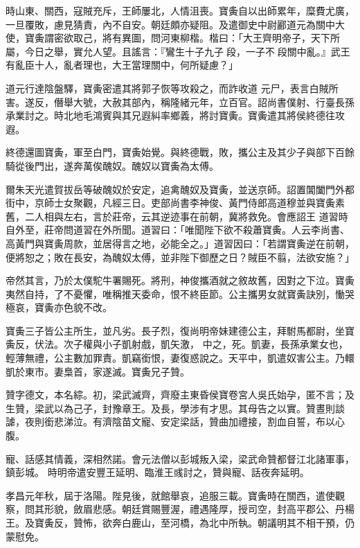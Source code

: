 \begin{pinyinscope}
 時山東、關西，寇賊充斥，王師屢北，人情沮喪。寶夤自以出師累年，糜費尤廣，一旦覆敗，慮見猜責，內不自安。朝廷頗亦疑阻。及遣御史中尉酈道元為關中大使，寶夤謂密欲取己，將有異圖，問河東柳楷。楷曰：「大王齊明帝子，天下所屬，今日之舉，實允人望。且謠言：『鸞生十子九子段，一子不段關中亂。』武王有亂臣十人，亂者理也，大王當理關中，何所疑慮？」



 道元行達陰盤驛，寶夤密遣其將郭子恢等攻殺之，而詐收道
 元尸，表言白賊所害。遂反，僭舉大號，大赦其部內，稱隆緒元年，立百官。詔尚書僕射、行臺長孫承業討之。時北地毛鴻賓與其兄遐糾率鄉義，將討寶夤。寶夤遣其將侯終德往攻遐。



 終德還圖寶夤，軍至白門，寶夤始覺。與終德戰，敗，攜公主及其少子與部下百餘騎從後門出，遂奔萬俟醜奴。醜奴以寶夤為太傅。



 爾朱天光遣賀拔岳等破醜奴於安定，追禽醜奴及寶夤，並送京師。詔置閶闔門外都街中，京師士女聚觀，凡經三日。吏部尚書李神俊、黃門侍郎高道穆並與寶夤素舊，二人相與左右，言於莊帝，云其逆迹事在前朝，冀將救免。會應詔王
 道習時自外至，莊帝問道習在外所聞。道習曰：「唯聞陛下欲不殺蕭寶夤。人云李尚書、高黃門與寶夤周款，並居得言之地，必能全之。」道習因曰：「若謂寶夤逆在前朝，便將恕之；敗在長安，為醜奴太傅，並非陛下御歷之日？賊臣不翦，法欲安施？」



 帝然其言，乃於太僕駝牛署賜死。將刑，神俊攜酒就之敘故舊，因對之下泣。寶夤夷然自持，了不憂懼，唯稱推天委命，恨不終臣節。公主攜男女就寶夤訣別，慟哭極哀，寶夤亦色貌不改。



 寶夤三子皆公主所生，並凡劣。長子烈，復尚明帝妹建德公主，拜駙馬都尉，坐寶夤反，伏法。次子權與小子凱射戲，凱矢激，
 中之，死。凱妻，長孫承業女也，輕薄無禮，公主數加罪責。凱竊銜恨，妻復惑說之。天平中，凱遣奴害公主。乃轘凱於東市。妻梟首，家遂滅。寶夤兄子贊。



 贊字德文，本名綜。初，梁武滅齊，齊廢主東昏侯寶卷宮人吳氏始孕，匿不言；及生贊，梁武以為己子，封豫章王。及長，學涉有才思。其母告之以實。贊晝則談謔，夜則銜悲涕泣。有濟陰苗文寵、安定梁話，贊曲加禮接，割血自誓，布以心腹。



 寵、話感其情義，深相然諾。會元法僧以彭城叛入梁，梁武命贊都督江北諸軍事，鎮彭城。
 時明帝遣安豐王延明、臨淮王彧討之，贊與寵、話夜奔延明。



 孝昌元年秋，屆于洛陽。陛見後，就館舉哀，追服三載。寶夤時在關西，遣使觀察，問其形貌，斂眉悲感。朝廷賞賜豐渥，禮遇隆厚，授司空，封高平郡公、丹楊王。及寶夤反，贊怖，欲奔白鹿山，至河橋，為北中所執。朝議明其不相干預，仍蒙慰免。




\end{pinyinscope}
